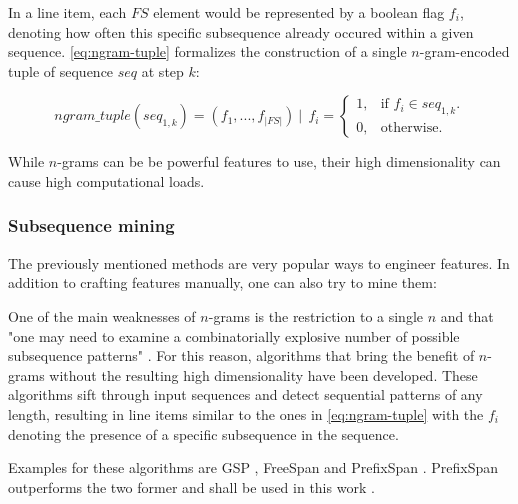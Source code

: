 In a line item, each $FS$ element would be represented by a boolean flag $f_i$, denoting how often this specific subsequence already occured within a given sequence. \autoref{eq:ngram-tuple} formalizes the construction of a single $n$-gram-encoded tuple of sequence $seq$ at step $k$:

\begin{equation}\label{eq:ngram-tuple}
    ngram\_tuple(seq_{1,k}) = (f_1, ..., f_{|FS|})\ |\ \ f_i = 
    \begin{cases}
    1, & \text{if $f_i \in seq_{1,k}$}.\\
    0, & \text{otherwise}.
    \end{cases}
\end{equation}

While $n$-grams can be be powerful features to use, their high dimensionality can cause high computational loads.

\subsubsection*{Subsequence mining}
The previously mentioned methods are very popular ways to engineer features. In addition to crafting features manually, one can also try to mine them:

One of the main weaknesses of $n$-grams is the restriction to a single $n$ and that "one may need to examine a combinatorially explosive
number of possible subsequence patterns" \cite{pei2001prefixspan}. For this reason, algorithms that bring the benefit of $n$-grams without the resulting high dimensionality have been developed. These algorithms sift through input sequences and detect sequential patterns of any length, resulting in line items similar to the ones in \autoref{eq:ngram-tuple} with the $f_i$ denoting the presence of a specific subsequence in the sequence.

Examples for these algorithms are GSP \cite{srikant1996gsp}, FreeSpan \cite{han2000freespan} and PrefixSpan \cite{pei2001prefixspan}. PrefixSpan outperforms the two former and shall be used in this work \cite{pei2001prefixspan}.